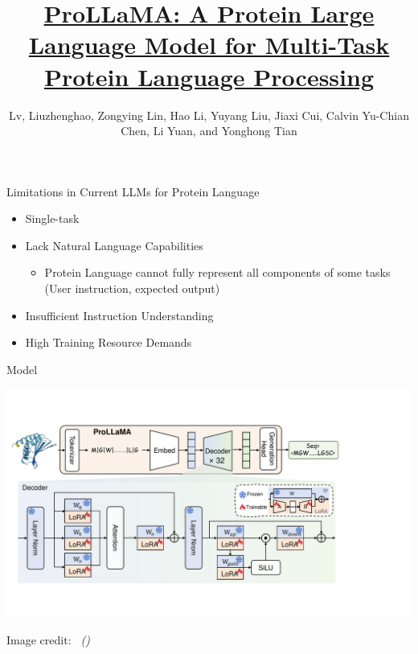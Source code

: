 \documentclass[dvipsnames,
hyperref={citecolor=blue}
]{beamer}
\title[ProLLaMA]
{\href{https://doi.org/10.48550/arXiv.2402.16445}{ProLLaMA: A Protein Large Language Model for Multi-Task Protein Language Processing}}
\author[Liuzhenghao Lv et al.]{Lv, Liuzhenghao, Zongying Lin, Hao Li, Yuyang Liu, Jiaxi Cui, Calvin Yu-Chian Chen, Li Yuan, and Yonghong Tian}
\date{}%
\newcommand{\credit}[2]{{\par\hfill \tiny #1 credit:~\itshape{\color{blue} \citeauthor{#2} (\citeyear{#2})}}}
\begin{document}
\begin{frame}
\titlepage
\end{frame}




\begin{frame}{Limitations in Current LLMs for Protein Language}
	\begin{itemize}
		\item Single-task
		\item Lack Natural Language Capabilities
		\begin{itemize}
			\item Protein Language cannot fully represent all components of some tasks (User instruction, expected output)
		\end{itemize}
		\item Insufficient Instruction Understanding
		\item High Training Resource Demands
	\end{itemize}
\end{frame}

\begin{frame}{Model}
	\begin{center}
		\includegraphics[scale=0.44]{images/model.pdf}
	\end{center}
	\credit{Image}{lv2024prollama}
\end{frame}
\end{document}
